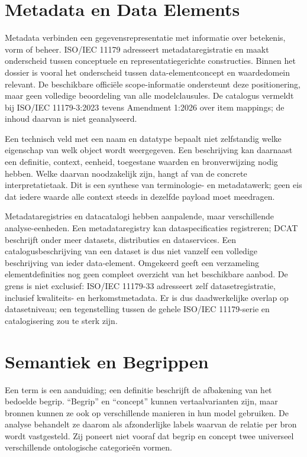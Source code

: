 \section{Metadata en Data Elements}
Metadata verbinden een gegevensrepresentatie met informatie over betekenis, vorm of beheer. ISO/IEC 11179 adresseert metadataregistratie en maakt onderscheid tussen conceptuele en representatiegerichte constructies. Binnen het dossier is vooral het onderscheid tussen data-elementconcept en waardedomein relevant. De beschikbare officiële scope-informatie ondersteunt deze positionering, maar geen volledige beoordeling van alle modelclausules. De catalogus vermeldt bij ISO/IEC 11179-3:2023 tevens Amendment 1:2026 over item mappings; de inhoud daarvan is niet geanalyseerd. \parencite{S07,S08,S09,S10}

Een technisch veld met een naam en datatype bepaalt niet zelfstandig welke eigenschap van welk object wordt weergegeven. Een beschrijving kan daarnaast een definitie, context, eenheid, toegestane waarden en bronverwijzing nodig hebben. Welke daarvan noodzakelijk zijn, hangt af van de concrete interpretatietaak. Dit is een synthese van terminologie- en metadatawerk; geen eis dat iedere waarde alle context steeds in dezelfde payload moet meedragen. \parencite{S11,S08,S14}

Metadataregistries en datacatalogi hebben aanpalende, maar verschillende analyse-eenheden. Een metadataregistry kan dataspecificaties registreren; DCAT beschrijft onder meer datasets, distributies en dataservices. Een catalogusbeschrijving van een dataset is dus niet vanzelf een volledige beschrijving van ieder data-element. Omgekeerd geeft een verzameling elementdefinities nog geen compleet overzicht van het beschikbare aanbod. De grens is niet exclusief: ISO/IEC 11179-33 adresseert zelf datasetregistratie, inclusief kwaliteits- en herkomstmetadata. Er is dus daadwerkelijke overlap op datasetniveau; een tegenstelling tussen de gehele ISO/IEC 11179-serie en catalogisering zou te sterk zijn. \parencite{S08,S09,S47}

\section{Semantiek en Begrippen}
Een term is een aanduiding; een definitie beschrijft de afbakening van het bedoelde begrip. ``Begrip'' en ``concept'' kunnen vertaalvarianten zijn, maar bronnen kunnen ze ook op verschillende manieren in hun model gebruiken. De analyse behandelt ze daarom als afzonderlijke labels waarvan de relatie per bron wordt vastgesteld. Zij poneert niet vooraf dat begrip en concept twee universeel verschillende ontologische categorieën vormen. \parencite{S11,S13,S31}

